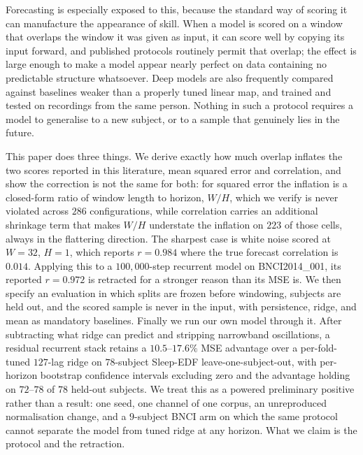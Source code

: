 \documentclass{article}
\begin{document}
Forecasting is especially exposed to this, because the standard way of
scoring it can manufacture the appearance of skill. When a model is scored on
a window that overlaps the window it was given as input, it can score well by
copying its input forward, and published protocols routinely permit that
overlap; the effect is large enough to make a model appear nearly perfect on
data containing no predictable structure whatsoever. Deep models are also
frequently compared against baselines weaker than a properly tuned linear
map, and trained and tested on recordings from the same person. Nothing in
such a protocol requires a model to generalise to a new subject, or to a
sample that genuinely lies in the future.

This paper does three things. We derive exactly how much overlap inflates the
two scores reported in this literature, mean squared error and correlation,
and show the correction is not the same for both: for squared error the
inflation is a closed-form ratio of window length to horizon, $W/H$, which we
verify is never violated across $286$ configurations, while correlation
carries an additional shrinkage term that makes $W/H$ understate the
inflation on $223$ of those cells, always in the flattering direction. The
sharpest case is white noise scored at $W{=}32$, $H{=}1$, which reports
$r = 0.984$ where the true forecast correlation is $0.014$. Applying this to
a $100{,}000$-step recurrent model on BNCI2014\_001, its reported $r = 0.972$
is retracted for a stronger reason than its MSE is. We then specify an
evaluation in which splits are frozen before windowing, subjects are held
out, and the scored sample is never in the input, with persistence, ridge,
and mean as mandatory baselines. Finally we run our own model through it.
After subtracting what ridge can predict and stripping narrowband
oscillations, a residual recurrent stack retains a $10.5$--$17.6\%$ MSE
advantage over a per-fold-tuned $127$-lag ridge on $78$-subject Sleep-EDF
leave-one-subject-out, with per-horizon bootstrap confidence intervals
excluding zero and the advantage holding on $72$--$78$ of $78$ held-out
subjects. We treat this as a powered preliminary positive
rather than a result: one seed, one channel of one corpus, an unreproduced
normalisation change, and a $9$-subject BNCI arm on which the same protocol
cannot separate the model from tuned ridge at any horizon. What we claim is
the protocol and the retraction.
\end{document}
